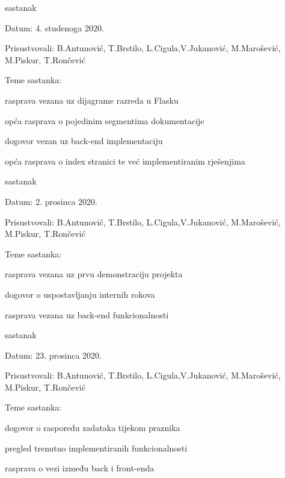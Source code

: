 \begin{packed_enum}
			\item  sastanak
			\item[] \begin{packed_item}
				\item Datum: 4. studenoga 2020.
				\item Prisustvovali: B.Antunović, T.Brstilo, L.Cigula,V.Jukanović, M.Marošević, M.Piskur, T.Rončević
				\item Teme sastanka:
				\begin{packed_item}
					\item  rasprava vezana uz dijagrame razreda u Flasku
					\item  opća rasprava o pojedinim segmentima dokumentacije
					\item  dogovor vezan uz back-end implementaciju
					\item  opća rasprava o index stranici te već implementiranim rješenjima
				\end{packed_item}
			\end{packed_item}	
			
			\item  sastanak
			\item[] \begin{packed_item}
				\item Datum: 2. prosinca 2020.
				\item Prisustvovali: B.Antunović, T.Brstilo, L.Cigula,V.Jukanović, M.Marošević, M.Piskur, T.Rončević
				\item Teme sastanka:
				\begin{packed_item}
					\item  rasprava vezana uz prvu demonstraciju projekta
					\item  dogovor o uspostavljanju internih rokova
					\item  rasprava vezana uz back-end funkcionalnosti
				\end{packed_item}
			\end{packed_item}
		
			\item  sastanak
			\item[] \begin{packed_item}
				\item Datum: 23. prosinca 2020.
				\item Prisustvovali: B.Antunović, T.Brstilo, L.Cigula,V.Jukanović, M.Marošević, M.Piskur, T.Rončević
				\item Teme sastanka:
				\begin{packed_item}
					\item  dogovor o rasporedu zadataka tijekom praznika
					\item  pregled trenutno implementiranih funkcionalnosti
					\item  rasprava o vezi između back i front-enda	
			\end{packed_item}
		\end{packed_item}
		

\end{packed_enum}
